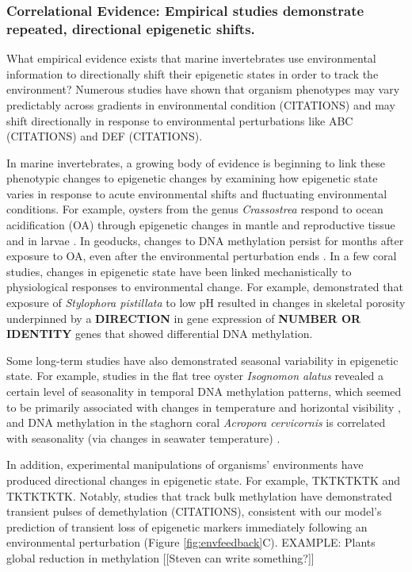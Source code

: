\documentclass{article}
\begin{document}
\subsubsection{Correlational Evidence: Empirical studies demonstrate repeated, directional epigenetic shifts.}

What empirical evidence exists that marine invertebrates use environmental information to directionally shift their epigenetic states in order to track the environment? Numerous studies have shown that organism phenotypes may vary predictably across gradients in environmental condition (CITATIONS) and may shift directionally in response to environmental perturbations like ABC (CITATIONS) and DEF (CITATIONS). 

In marine invertebrates, a growing body of evidence is beginning to link these phenotypic changes to epigenetic changes by examining how epigenetic state varies in response to acute environmental shifts and fluctuating environmental conditions. For example, oysters from the genus \textit{Crassostrea} respond to ocean acidification (OA) through epigenetic changes in mantle \citep{downey2020ocean,chandra2021oyster} and reproductive \citep{venkataraman2020general,venkataraman2022differential} tissue and in larvae \citep{dang2023epigenetic,lim2021dna}. In geoducks, changes to DNA methylation persist for months after exposure to OA, even after the environmental perturbation ends \citep{putnam2022dynamic}. In a few coral studies, changes in epigenetic state have been linked mechanistically to physiological responses to environmental change. For example, 
\citet{liew2018epigenome} demonstrated that exposure of \textit{Stylophora pistillata} to low pH resulted in changes in skeletal porosity underpinned by a \textbf{DIRECTION} in gene expression of \textbf{NUMBER OR IDENTITY} genes that showed differential DNA methylation.


Some long-term studies have also demonstrated seasonal variability in epigenetic state. For example, studies in the flat tree oyster \textit{Isognomon alatus} revealed a certain level of seasonality in temporal DNA methylation patterns, which seemed to be primarily associated with changes in temperature and horizontal visibility \citep{suarez2019seasonal}, and DNA methylation in the staghorn coral \textit{Acropora cervicornis} is correlated with seasonality (via changes in seawater temperature) \citep{rodriguez2020genome}.

In addition, experimental manipulations of organisms' environments have produced directional changes in epigenetic state. For example, TKTKTKTK and TKTKTKTK. Notably, studies that track bulk methylation have demonstrated transient pulses of demethylation (CITATIONS), consistent with our model's prediction of transient loss of epigenetic markers immediately following an environmental perturbation (Figure \ref{fig:envfeedback}C). EXAMPLE: Plants global reduction in methylation [[Steven can write something?]]
\end{document}
